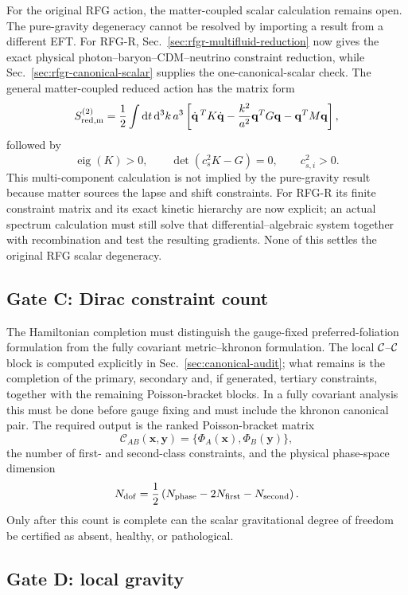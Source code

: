 \documentclass[11pt,a4paper]{article}
\renewcommand{\dd}{\mathrm{d}}
\begin{document}
For the original RFG action, the matter-coupled scalar calculation remains open.  The pure-gravity degeneracy cannot be resolved by importing a result from a different EFT.  For RFG-R, Sec.~\ref{sec:rfgr-multifluid-reduction} now gives the exact physical photon--baryon--CDM--neutrino constraint reduction, while Sec.~\ref{sec:rfgr-canonical-scalar} supplies the one-canonical-scalar check.  The general matter-coupled reduced action has the matrix form
\[
S_{\rm red,m}^{(2)}
=
\frac12
\int\dd t\,\dd^3k\,a^3
\left[
\dot{\mathbf q}^{\,T}K\dot{\mathbf q}
-\frac{k^2}{a^2}\mathbf q^{T}G\mathbf q
-\mathbf q^{T}M\mathbf q
\right],
\]
followed by
\[
\operatorname{eig}(K)>0,\qquad
\det(c_s^2K-G)=0,\qquad c_{s,i}^2>0.
\]
This multi-component calculation is not implied by the pure-gravity result because matter sources the lapse and shift constraints.  For RFG-R its finite constraint matrix and its exact kinetic hierarchy are now explicit; an actual spectrum calculation must still solve that differential--algebraic system together with recombination and test the resulting gradients.  None of this settles the original RFG scalar degeneracy.

\subsection{Gate C: Dirac constraint count}

The Hamiltonian completion must distinguish the gauge-fixed preferred-foliation formulation from the fully covariant metric--khronon formulation. The local \({\cal C}\)--\({\cal C}\) block is computed explicitly in Sec.~\ref{sec:canonical-audit}; what remains is the completion of the primary, secondary and, if generated, tertiary constraints, together with the remaining Poisson-bracket blocks. In a fully covariant analysis this must be done before gauge fixing and must include the khronon canonical pair. The required output is the ranked Poisson-bracket matrix
\[
\mathcal C_{AB}(\mathbf{x},\mathbf{y})
=
\{\Phi_A(\mathbf{x}),\Phi_B(\mathbf{y})\},
\]
the number of first- and second-class constraints, and the physical phase-space dimension
\[
N_{\rm dof}
=
\frac12\left(N_{\rm phase}-2N_{\rm first}-N_{\rm second}\right).
\]
Only after this count is complete can the scalar gravitational degree of freedom be certified as absent, healthy, or pathological.

\subsection{Gate D: local gravity}
\end{document}
